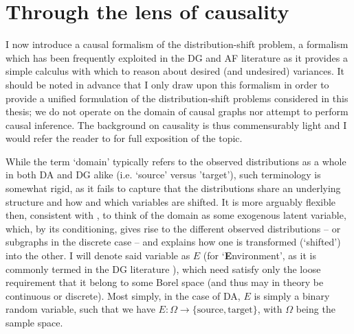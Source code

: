 \section{Through the lens of causality}\label{sec:lens-of-causality}

I now introduce a causal formalism of the distribution-shift problem, a formalism which has been
frequently exploited in the \ac{DG} and \ac{AF} literature as it provides a simple calculus with
which to reason about desired (and undesired) variances.
%
It should be noted in advance that I only draw upon this formalism in order to provide a unified
formulation of the distribution-shift problems considered in this thesis; we do not operate on the
domain of causal graphs nor attempt to perform causal inference. 
%
The background on causality is thus commensurably light and I would refer the reader to
\citet{pearl2009causality} for full exposition of the topic.

While the term `domain' typically refers to the observed distributions as a whole in both \ac{DA}
and \ac{DG}
alike (i.e. `source' versus 'target'), such terminology is somewhat rigid, as it fails to capture
that the distributions share an underlying structure and how and which variables are shifted.
%
It is more arguably flexible then, consistent with \citep{mooij2020joint}, to think of the domain
as some exogenous latent variable, which, by its conditioning, gives rise to the different observed
distributions -- or subgraphs in the discrete case -- and explains how one is transformed
(`shifted') into the other.
%
I will denote said variable as \(E\) (for `\textbf{E}nvironment', as it is commonly termed in the
\ac{DG} literature \citep{arjovsky2019invariant}), which need satisfy only the loose requirement that it
belong to some Borel space (and thus may in theory be continuous or discrete).
%
Most simply, in the case of \ac{DA}, \(E\) is simply a binary random variable, such that we have \(E:
\Omega \to \{ \text{source}, \text{target} \}\), with \( \Omega \) being the sample space.
%

